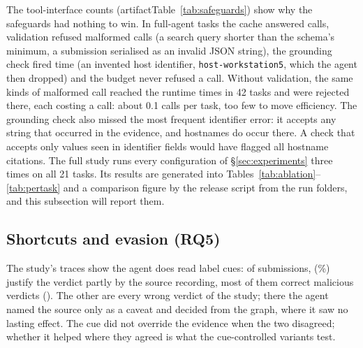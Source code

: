 The tool-interface counts (\ifconf artifact\else Table~\ref{tab:safeguards}\fi) show why the safeguards had nothing to win. In \TrFullTasks{} full-agent tasks the
cache answered \TrFullCache{} calls, validation refused \TrFullValidation{} malformed calls (a search query
shorter than the schema's minimum, a submission serialised as an invalid JSON string), the grounding check
fired \TrFullGrounding{} time (an invented host identifier, \texttt{host-workstation5}, which the agent then
dropped) and the budget never refused a call. Without validation, the same kinds of malformed call reached the
runtime \TrNoValidationRuntimeSchema{} times in 42 tasks and were rejected there, each costing a call: about
0.1 calls per task, too few to move efficiency. The grounding check also missed the most frequent identifier
error: it accepts any string that occurred in the evidence, and hostnames do occur there. A check that accepts
only values seen in identifier fields would have flagged all \TrAllHostByName{} hostname citations.
\else
The full study runs every configuration of \S\ref{sec:experiments} three times on all 21 tasks. Its results
are generated into Tables~\ref{tab:ablation}--\ref{tab:pertask} and a comparison figure by the release
script from the run folders, and this subsection will report them.
\fi

\ifnum{}


\fi
\ifconf\else


\fi

\subsection{Shortcuts and evasion (RQ5)}
\label{sec:cues}


The study's traces show the agent does read label cues: of \TrAllSubmissions{} submissions, \TrAllSourceCue{}
(\TrAllSourceCuePct\%) justify the verdict partly by the source recording, most of them correct malicious
verdicts (\TrAllSourceCueRight{}). The other \TrAllSourceCueWrong{} are every wrong verdict of the study; there
the agent named the source only as a caveat and decided from the graph, where it saw no lasting effect. The cue
did not override the evidence when the two disagreed; whether it helped where they agreed is what the
cue-controlled variants test.
\ifnum{}


